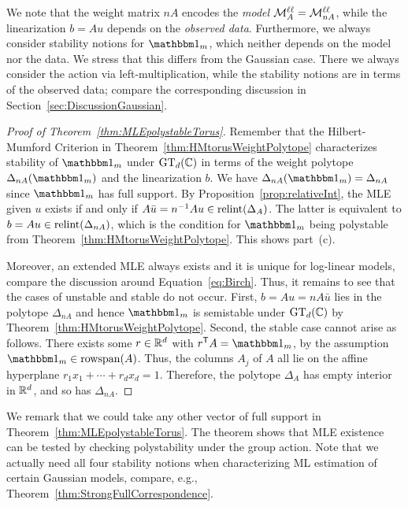 \begin{remark}
	We note that the weight matrix $nA$ encodes the \emph{model} $\mathcal{M}^{\mathtt{\ell \ell}}_A = \mathcal{M}^{\mathtt{\ell \ell}}_{nA}$, while the linearization $b = Au$ depends on the \emph{observed data}. Furthermore, we always consider stability notions for $\ones_m$, which neither depends on the model nor the data. We stress that this differs from the Gaussian case. There we always consider the action via left-multiplication, while the stability notions are in terms of the observed data; compare the corresponding discussion in Section~\ref{sec:DiscussionGaussian}.
	\hfill\remSymbol
\end{remark}

\begin{proof}[Proof of Theorem~\ref{thm:MLEpolystableTorus}]
	Remember that the Hilbert-Mumford Criterion in Theorem~\ref{thm:HMtorusWeightPolytope} characterizes stability of $\ones_m$ under $\operatorname{GT}_d(\mathbb C)$ in terms of the weight polytope $\Delta_{nA}(\ones_m)$ and the linearization $b$. We have $\Delta_{nA}(\ones_m) = \Delta_{nA}$ since $\ones_m$ has full support.
	By Proposition~\ref{prop:relativeInt}, the MLE given $u$ exists if and only if $A \bar{u} = n^{-1} Au \in \operatorname{relint}(\Delta_{A})$. The latter is equivalent to $b = Au \in \operatorname{relint}(\Delta_{nA})$, which is the condition for $\ones_m$ being polystable from Theorem~\ref{thm:HMtorusWeightPolytope}. This shows part~(c). 
	
	Moreover, an extended MLE always exists and it is unique for log-linear models, compare the discussion around Equation~\eqref{eq:Birch}.
	Thus, it remains to see that the cases of unstable and stable do not occur. First, $b = Au = nA \bar{u}$ lies in the polytope $\Delta_{nA}$ and hence $\ones_m$ is semistable under $\operatorname{GT}_d(\mathbb C)$ by Theorem~\ref{thm:HMtorusWeightPolytope}.
	Second, the stable case cannot arise as follows. There exists some $r \in \mathbb R^d$ with $r\T A = \ones_m$, by the assumption $\ones_m \in \rsp(A)$. Thus, the columns $A_j$ of $A$ all lie on the affine hyperplane $r_1 x_1 + \cdots + r_d x_d = 1$. Therefore, the polytope $\Delta_A$ has empty interior in $\mathbb R^d$, and so has $\Delta_{nA}$.
\end{proof}

We remark that we could take any other vector of full support in Theorem~\ref{thm:MLEpolystableTorus}. 
The theorem shows that MLE existence can be tested by checking polystability under the group action. Note that we actually need all four stability notions when characterizing ML estimation of certain Gaussian models, compare, e.g., Theorem~\ref{thm:StrongFullCorrespondence}.

